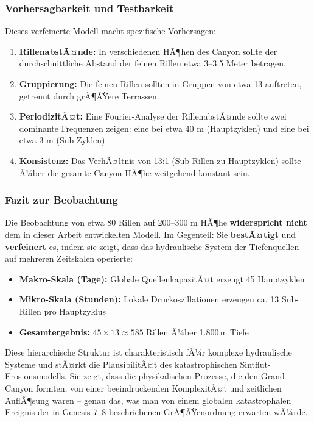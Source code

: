 \subsubsection{Vorhersagbarkeit und Testbarkeit}

Dieses verfeinerte Modell macht spezifische Vorhersagen:

\begin{enumerate}
	\item \textbf{RillenabstÃ¤nde:} In verschiedenen HÃ¶hen des Canyon sollte der durchschnittliche Abstand der feinen Rillen etwa 3--3,5 Meter betragen.
	
	\item \textbf{Gruppierung:} Die feinen Rillen sollten in Gruppen von etwa 13 auftreten, getrennt durch grÃ¶ÃŸere Terrassen.
	
	\item \textbf{PeriodizitÃ¤t:} Eine Fourier-Analyse der RillenabstÃ¤nde sollte zwei dominante Frequenzen zeigen: eine bei etwa 40 m (Hauptzyklen) und eine bei etwa 3 m (Sub-Zyklen).
	
	\item \textbf{Konsistenz:} Das VerhÃ¤ltnis von 13:1 (Sub-Rillen zu Hauptzyklen) sollte Ã¼ber die gesamte Canyon-HÃ¶he weitgehend konstant sein.
\end{enumerate}

\subsubsection{Fazit zur Beobachtung}

Die Beobachtung von etwa 80 Rillen auf 200--300 m HÃ¶he \textbf{widerspricht nicht} dem in dieser Arbeit entwickelten Modell. Im Gegenteil: Sie \textbf{bestÃ¤tigt} und \textbf{verfeinert} es, indem sie zeigt, dass das hydraulische System der Tiefenquellen auf mehreren Zeitskalen operierte:

\begin{itemize}
	\item \textbf{Makro-Skala (Tage):} Globale QuellenkapazitÃ¤t erzeugt 45 Hauptzyklen
	\item \textbf{Mikro-Skala (Stunden):} Lokale Druckoszillationen erzeugen ca. 13 Sub-Rillen pro Hauptzyklus
	\item \textbf{Gesamtergebnis:} $45 \times 13 \approx 585$ Rillen Ã¼ber 1.800\,m Tiefe
\end{itemize}

Diese hierarchische Struktur ist charakteristisch fÃ¼r komplexe hydraulische Systeme und stÃ¤rkt die PlausibilitÃ¤t des katastrophischen Sintflut-Erosionsmodells. Sie zeigt, dass die physikalischen Prozesse, die den Grand Canyon formten, von einer beeindruckenden KomplexitÃ¤t und zeitlichen AuflÃ¶sung waren -- genau das, was man von einem globalen katastrophalen Ereignis der in Genesis 7--8 beschriebenen GrÃ¶ÃŸenordnung erwarten wÃ¼rde.

